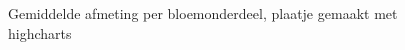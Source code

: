 \begin{figure}
    \caption{Gemiddelde afmeting per bloemonderdeel, plaatje gemaakt met highcharts}

    \label{fig:gemiddelde_afmeting_hc}

\end{figure}
